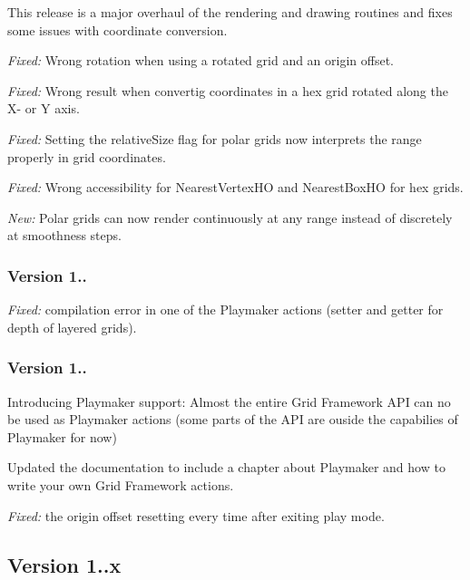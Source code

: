This release is a major overhaul of the rendering and drawing routines and fixes some issues with coordinate conversion.
\begin{DoxyItemize}
\item {\itshape Fixed\+:} Wrong rotation when using a rotated grid and an origin offset.
\item {\itshape Fixed\+:} Wrong result when convertig coordinates in a hex grid rotated along the X-\/ or Y axis.
\item {\itshape Fixed\+:} Setting the {\ttfamily relative\+Size} flag for polar grids now interprets the range properly in grid coordinates.
\item {\itshape Fixed\+:} Wrong accessibility for {\ttfamily Nearest\+Vertex\+H\+O} and {\ttfamily Nearest\+Box\+H\+O} for hex grids.
\item {\itshape New\+:} Polar grids can now render continuously at any range instead of discretely at smoothness steps.
\end{DoxyItemize}

\subsubsection*{Version 1..}


\begin{DoxyItemize}
\item {\itshape Fixed\+:} compilation error in one of the Playmaker actions (setter and getter for depth of layered grids).
\end{DoxyItemize}

\subsubsection*{Version 1..}


\begin{DoxyItemize}
\item Introducing Playmaker support\+: Almost the entire Grid Framework A\+P\+I can no be used as Playmaker actions (some parts of the A\+P\+I are ouside the capabilies of Playmaker for now)
\item Updated the documentation to include a chapter about Playmaker and how to write your own Grid Framework actions.
\item {\itshape Fixed\+:} the origin offset resetting every time after exiting play mode. 


\end{DoxyItemize}

\subsection*{Version 1..\+x }

